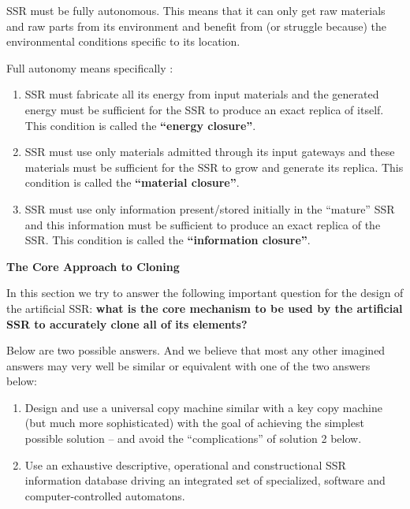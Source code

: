 SSR must be fully autonomous. This means that it can only get raw
materials and raw parts from its environment and benefit from (or
struggle because) the environmental conditions specific to its
location.

Full autonomy means specifically :


\bigskip

\begin{enumerate}
\item SSR must fabricate all its energy from input materials and the
generated energy must be sufficient for the SSR to produce an exact
replica of itself. This condition is called the \textbf{“energy
closure”}. 
\item SSR must use only materials admitted through its input gateways
and these materials must be sufficient for the SSR to grow and generate
its replica. This condition is called the \textbf{“material closure”}. 
\item SSR must use only information present/stored initially in the
“mature” SSR and this information must be sufficient to produce an
exact replica of the SSR. This condition is called the
\textbf{“information closure”}.
\end{enumerate}

\bigskip

{\bfseries
\hypertarget{RefHeading3118306210128}{}The Core Approach to Cloning}


\bigskip

In this section we try to answer the following important question for
the design of the artificial SSR: \textbf{what is the core mechanism to
be used by the artificial SSR to accurately clone all of its elements?}


\bigskip

Below are two possible answers. And we believe that most any other
imagined answers may very well be similar or equivalent with one of the
two answers below:


\bigskip

\begin{enumerate}
\item Design and use a universal copy machine similar with a key copy
machine (but much more sophisticated) with the goal of achieving the
simplest possible solution – and avoid the “complications” of solution
2 below.
\item Use an exhaustive descriptive, operational and constructional SSR
information database driving an integrated set of specialized, software
and computer-controlled automatons.
\end{enumerate}

